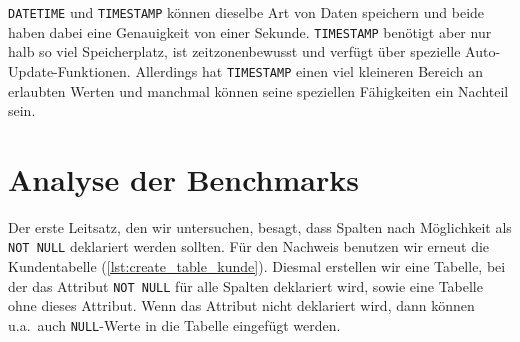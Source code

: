 \texttt{DATETIME} und \texttt{TIMESTAMP} können dieselbe Art von Daten speichern und beide haben dabei eine Genauigkeit von einer Sekunde.
\texttt{TIMESTAMP} benötigt aber nur halb so viel Speicherplatz, ist zeitzonenbewusst und verfügt über spezielle Auto-Update-Funktionen.
Allerdings hat \texttt{TIMESTAMP} einen viel kleineren Bereich an erlaubten Werten und manchmal können seine speziellen Fähigkeiten ein Nachteil sein.

\section{Analyse der Benchmarks}\label{sec:data-types-analyse-der-benchmarks}

Der erste Leitsatz, den wir untersuchen, besagt, dass Spalten nach Möglichkeit als \texttt{NOT NULL} deklariert werden sollten.
Für den Nachweis benutzen wir erneut die Kundentabelle (\ref{lst:create_table_kunde}).
Diesmal erstellen wir eine Tabelle, bei der das Attribut \texttt{NOT NULL} für alle Spalten deklariert wird, sowie eine Tabelle ohne dieses Attribut.
Wenn das Attribut nicht deklariert wird, dann können u.a.\ auch \texttt{NULL}-Werte in die Tabelle eingefügt werden.

